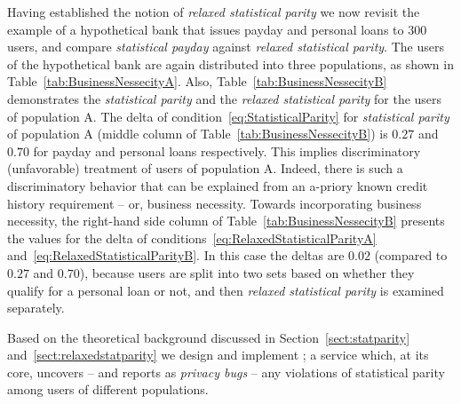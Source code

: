 Having established the notion of {\em relaxed statistical parity} we now revisit
the example of a hypothetical bank that issues payday and personal loans to 300
users, and compare {\em statistical payday} against {\em relaxed statistical
parity}. The users of the hypothetical bank are again distributed into three
populations, as shown in Table~\ref{tab:BusinessNessecityA}. Also,
Table~\ref{tab:BusinessNessecityB} demonstrates the {\em statistical parity}
and the {\em relaxed statistical parity} for the users of population A.
The delta
of condition~\ref{eq:StatisticalParity} for {\em statistical parity} of
population A (middle column of Table~\ref{tab:BusinessNessecityB}) is $0.27$
and $0.70$ for payday and personal loans respectively. This implies
discriminatory (unfavorable) treatment of users of population A. Indeed, there
is such a discriminatory behavior that can be explained from an a-priory known
credit history requirement -- or, business necessity. Towards incorporating
business necessity, the right-hand side column of
Table~\ref{tab:BusinessNessecityB} presents the values for the delta of
conditions~\ref{eq:RelaxedStatisticalParityA}
and~\ref{eq:RelaxedStatisticalParityB}. In this case the deltas are $0.02$
(compared to $0.27$ and $0.70$), because users are split into two sets
based on whether they qualify for a personal loan or not, and then
{\em relaxed statistical parity} is examined separately.

Based on the theoretical background discussed in Section~\ref{sect:statparity}
and~\ref{sect:relaxedstatparity} we design and implement \sysname; a service
which, at its core, uncovers -- and reports as {\em privacy bugs} -- any violations
of statistical parity among users of different populations.


